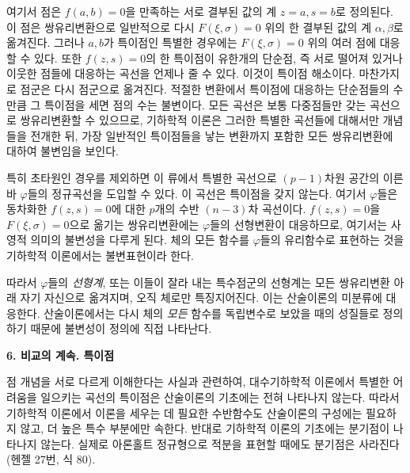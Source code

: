 여기서 \glqq{}점\grqq{}은 \(f(a,b)=0\)을 만족하는 서로 결부된 값의 계 \(z=a,s=b\)로 정의된다. 이 점은 쌍유리변환으로 일반적으로 다시 \(F(\xi,\sigma)=0\) 위의 한 결부된 값의 계 \(\alpha,\beta\)로 옮겨진다. 그러나 \(a,b\)가 \glqq{}특이\grqq{}점인 특별한 경우에는 \(F(\xi,\sigma)=0\) 위의 여러 \glqq{}점\grqq{}에 대응할 수 있다. 또한 \(f(z,s)=0\)의 한 \glqq{}특이\grqq{}점이 유한개의 단순점, 즉 서로 떨어져 있거나 이웃한 점들에 대응하는 곡선을 언제나 줄 수 있다. 이것이 특이점 해소이다. 마찬가지로 점군은 다시 점군으로 옮겨진다. 적절한 변환에서 특이점에 대응하는 단순점들의 수만큼 그 특이점을 세면 점의 수는 불변이다. 모든 곡선은 \glqq{}보통 다중\grqq{}점들만 갖는 곡선으로 쌍유리변환할 수 있으므로, 기하학적 이론은 그러한 특별한 곡선들에 대해서만 개념들을 전개한 뒤, 가장 일반적인 특이점들을 낳는 변환까지 포함한 모든 쌍유리변환에 대하여 불변임을 보인다.

특히 초타원인 경우를 제외하면 이 \glqq{}류\grqq{}에서 특별한 곡선으로 \((p-1)\)차원 공간의 이른바 \glqq{}\(\varphi\)들의 정규곡선\grqq{}을 도입할 수 있다. 이 곡선은 특이점을 갖지 않는다. 여기서 \(\varphi\)들은 동차화한 \(f(z,s)=0\)에 대한 \(p\)개의 \glqq{}수반 \((n-3)\)차 곡선\grqq{}이다. \(f(z,s)=0\)을 \(F(\xi,\sigma)=0\)으로 옮기는 쌍유리변환에는 \(\varphi\)들의 선형변환이 대응하므로, 여기서는 사영적 의미의 불변성을 다루게 된다. 체의 모든 함수를 \(\varphi\)들의 유리함수로 표현하는 것을 기하학적 이론에서는 \glqq{}불변표현\grqq{}이라 한다.

따라서 \(\varphi\)들의 \emph{선형계}, 또는 이들이 잘라 내는 \glqq{}특수점군\grqq{}의 선형계는 모든 쌍유리변환 아래 자기 자신으로 옮겨지며, 오직 체로만 특징지어진다. 이는 산술이론의 미분류에 대응한다. 산술이론에서는 다시 체의 \emph{모든} 함수를 독립변수로 보았을 때의 성질들로 정의하기 때문에 불변성이 정의에 직접 나타난다.

\begin{center}
\textbf{6. 비교의 계속. 특이점}
\end{center}

점 개념을 서로 다르게 이해한다는 사실과 관련하여, 대수기하학적 이론에서 특별한 어려움을 일으키는 곡선의 \glqq{}특이점\grqq{}은 산술이론의 기초에는 전혀 나타나지 않는다. 따라서 기하학적 이론에서 이론을 세우는 데 필요한 \glqq{}수반함수\grqq{}도 산술이론의 구성에는 필요하지 않고, 더 높은 특수 부분에만 속한다. 반대로 기하학적 이론의 기초에는 분기점이 나타나지 않는다. 실제로 아론홀트 정규형으로 적분을 표현할 때에도 분기점은 사라진다(헨젤 27번, 식 80).


